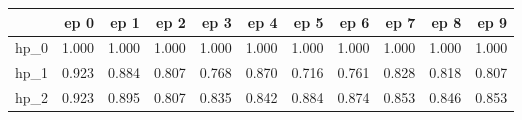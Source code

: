\begin{tabular}{lrrrrrrrrrr}
\toprule
{} &   ep 0 &   ep 1 &   ep 2 &   ep 3 &   ep 4 &   ep 5 &   ep 6 &   ep 7 &   ep 8 &   ep 9 \\
\midrule
hp\_0 &  1.000 &  1.000 &  1.000 &  1.000 &  1.000 &  1.000 &  1.000 &  1.000 &  1.000 &  1.000 \\
hp\_1 &  0.923 &  0.884 &  0.807 &  0.768 &  0.870 &  0.716 &  0.761 &  0.828 &  0.818 &  0.807 \\
hp\_2 &  0.923 &  0.895 &  0.807 &  0.835 &  0.842 &  0.884 &  0.874 &  0.853 &  0.846 &  0.853 \\
\bottomrule
\end{tabular}
